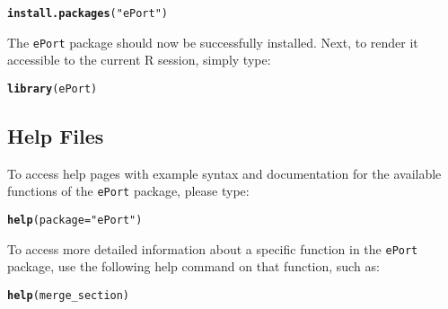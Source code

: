 \documentclass{article}\usepackage[]{graphicx}\usepackage[]{color}
\makeatletter
\newcommand{\hlstr}[1]{\textcolor[rgb]{0.192,0.494,0.8}{#1}}%
\newcommand{\hlstd}[1]{\textcolor[rgb]{0.345,0.345,0.345}{#1}}%
\newcommand{\hlkwc}[1]{\textcolor[rgb]{0.333,0.667,0.333}{#1}}%
\newcommand{\hlkwd}[1]{\textcolor[rgb]{0.737,0.353,0.396}{\textbf{#1}}}%
\newenvironment{kframe}{%
 \def\at@end@of@kframe{}%
 \ifinner\ifhmode%
  \def\at@end@of@kframe{\end{minipage}}%
  \begin{minipage}{\columnwidth}%
 \fi\fi%
 \def\FrameCommand##1{\hskip\@totalleftmargin \hskip-\fboxsep
 \colorbox{shadecolor}{##1}\hskip-\fboxsep
     \hskip-\linewidth \hskip-\@totalleftmargin \hskip\columnwidth}%
 \MakeFramed {\advance\hsize-\width
   \@totalleftmargin\z@ \linewidth\hsize
   \@setminipage}}%
 {\par\unskip\endMakeFramed%
 \at@end@of@kframe}
\newenvironment{knitrout}{}{} %
\numberwithin{equation}{section} %
\newcommand{\pkg}[1]{{\texttt{#1}}}
\newcommand{\R}{{\normalfont\textsf{R }}{}}
\makeatother
\begin{document}
\begin{knitrout}
\color{fgcolor}\begin{kframe}
\begin{alltt}
\hlkwd{install.packages}\hlstd{(}\hlstr{"ePort"}\hlstd{)}
\end{alltt}
\end{kframe}
\end{knitrout}

\noindent
The \pkg{ePort} package should now be successfully installed. Next, to render it accessible to the current \R session, simply type:

\begin{knitrout}
\color{fgcolor}\begin{kframe}
\begin{alltt}
\hlkwd{library}\hlstd{(ePort)}
\end{alltt}
\end{kframe}
\end{knitrout}

\subsection{Help Files}

To access help pages with example syntax and documentation for the available functions of the \pkg{ePort} package, please type:

\begin{knitrout}
\color{fgcolor}\begin{kframe}
\begin{alltt}
\hlkwd{help}\hlstd{(}\hlkwc{package}\hlstd{=}\hlstr{"ePort"}\hlstd{)}
\end{alltt}
\end{kframe}
\end{knitrout}

To access more detailed information about a specific function in the \pkg{ePort} package, use the following help command on that function, such as:

\begin{knitrout}
\color{fgcolor}\begin{kframe}
\begin{alltt}
\hlkwd{help}\hlstd{(merge_section)}
\end{alltt}
\end{kframe}
\end{knitrout}
\end{document}
